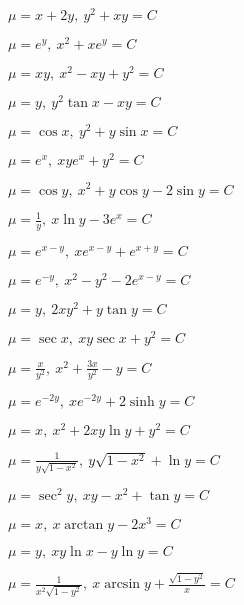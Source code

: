 \begin{enumsols}
		\label{sol:firstorder:intfactor}
		\item \( \mu = x + 2y, ~ y^2 + xy = C \) %
		\item \( \mu = e^{y}, ~ x^2 + xe^{y} = C \) %
		\item \( \mu = xy, ~ x^2 - xy + y^2 = C \) %
		\item \( \mu = y, ~ y^2 \tan{x} - xy = C \) %
		\item \( \mu = \cos{x}, ~ y^2 + y \sin{x} = C \) %
		\item \( \mu = e^{x}, ~ xye^{x} + y^2 = C \) %
		\item \( \mu = \cos{y}, ~ x^2 + y \cos{y} - 2 \sin{y} = C \) %
		\item \( \mu = \frac{1}{y}, ~ x \ln{y} - 3e^{x} = C \) %
		\item \( \mu = e^{x - y}, ~ xe^{x - y} + e^{x + y} = C \) %
		\item \( \mu = e^{-y}, ~ x^2 - y^2 - 2e^{x - y} = C \) %
		\item \( \mu = y, ~ 2xy^2 + y \tan{y} = C \) %
		\item \( \mu = \sec{x}, ~ xy\sec{x} + y^2 = C \) %
		\item \( \mu = \frac{x}{y^2}, ~ x^2 + \frac{3x}{y^2} - y = C \) %
		\item \( \mu = e^{-2y}, ~ xe^{-2y} + 2 \sinh{y} = C \) %
		\item \( \mu = x, ~ x^2 + 2xy \ln{y} + y^2 = C \) %
		\item \( \mu = \frac{1}{y \sqrt{1 - x^2}}, ~ y \sqrt{1 - x^2} + \ln{y} = C \) %
		\item \( \mu = \sec^2{y}, ~ xy - x^2 + \tan{y} = C \) %
		\item \( \mu = x, ~ x \arctan{y} - 2x^3 = C \) %
		\item \( \mu = y, ~ xy \ln{x} - y \ln{y} = C \) %
		\item \( \mu = \frac{1}{x^2 \sqrt{1 - y^2}}, ~ x \arcsin{y} + \frac{\sqrt{1 - y^2}}{x} = C \) %
	
	\end{enumsols}
